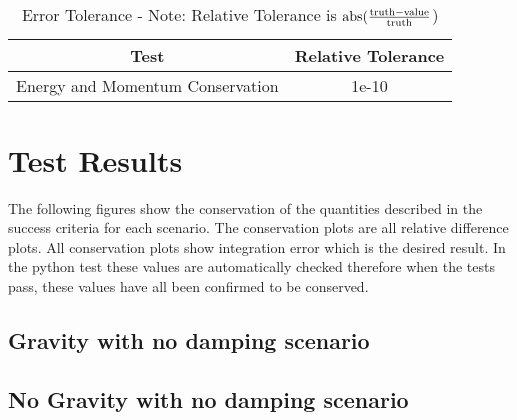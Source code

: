 \begin{table}[htbp]
	\caption{Error Tolerance - Note: Relative Tolerance is $\textnormal{abs}(\frac{\textnormal{truth} - \textnormal{value}}{\textnormal{truth}}$)}
	\label{tab:errortol}
	\centering \fontsize{10}{10}\selectfont
	\begin{tabular}{| c | c |} %
		\hline
		Test   & Relative Tolerance \\
		\hline
		Energy and Momentum Conservation & 1e-10 \\
		\hline
	\end{tabular}
\end{table}

\section{Test Results}

The following figures show the conservation of the quantities described in the success criteria for each scenario. The conservation plots are all relative difference plots. All conservation plots show integration error which is the desired result. In the python test these values are automatically checked therefore when the tests pass, these values have all been confirmed to be conserved. 

\subsection{Gravity with no damping scenario}




\clearpage

\subsection{No Gravity with no damping scenario}




\clearpage
